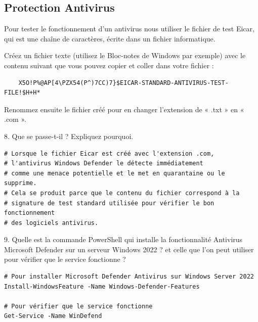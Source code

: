 \newpage

\subsection*{Protection Antivirus}
{}
\noindent Pour tester le fonctionnement d’un antivirus nous utiliser le fichier de test Eicar, qui est une chaîne de caractères, écrite dans un fichier informatique.

\noindent Créez un fichier texte (utilisez le Bloc-notes de Windows par exemple) avec le contenu suivant que vous pouvez copier et coller dans votre fichier :
\begin{center}
  \begin{verbatim}
    X5O!P%@AP[4\PZX54(P^)7CC)7}$EICAR-STANDARD-ANTIVIRUS-TEST-FILE!$H+H*
  \end{verbatim}
\end{center}

\noindent Renommez ensuite le fichier créé pour en changer l’extension de « .txt » en « .com ».

\vspace{0.5cm}

8. Que se passe-t-il ? Expliquez pourquoi.

\begin{verbatim}
# Lorsque le fichier Eicar est créé avec l'extension .com,
# l'antivirus Windows Defender le détecte immédiatement
# comme une menace potentielle et le met en quarantaine ou le supprime.
# Cela se produit parce que le contenu du fichier correspond à la
# signature de test standard utilisée pour vérifier le bon fonctionnement
# des logiciels antivirus.
\end{verbatim}

\vspace{0.5cm}

9. Quelle est la commande PowerShell qui installe la fonctionnalité Antivirus Microsoft Defender sur un serveur Windows 2022 ? et celle que l’on peut utiliser pour vérifier que le service fonctionne ?

\begin{verbatim}
# Pour installer Microsoft Defender Antivirus sur Windows Server 2022
Install-WindowsFeature -Name Windows-Defender-Features

# Pour vérifier que le service fonctionne
Get-Service -Name WinDefend
\end{verbatim}

\vspace{0.5cm}

